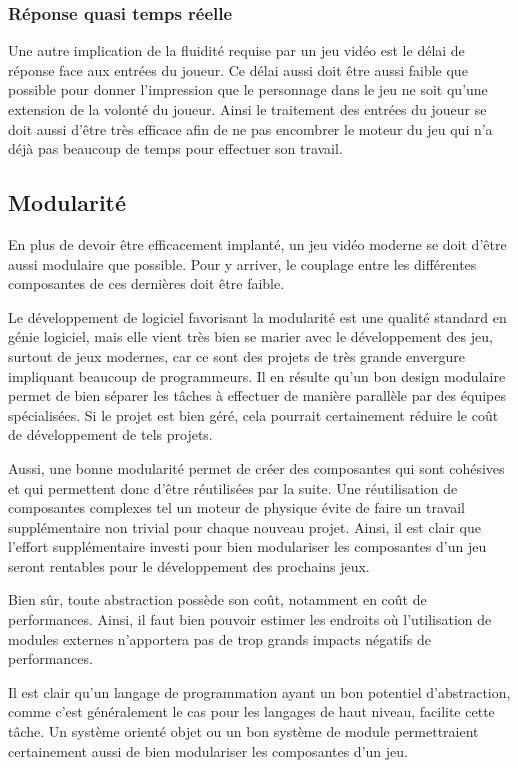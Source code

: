\documentclass[12pt,twoside,letterpaper,francais]{book}
\begin{document}
\FloatBarrier
\subsubsection{Réponse quasi temps réelle}
Une autre implication de la fluidité requise par un jeu vidéo est le
délai de réponse face aux entrées du joueur. Ce délai aussi doit être
aussi faible que possible pour donner l'impression que le personnage
dans le jeu ne soit qu'une extension de la volonté du joueur. Ainsi le
traitement des entrées du joueur se doit aussi d'être très efficace
afin de ne pas encombrer le moteur du jeu qui n'a déjà pas beaucoup de
temps pour effectuer son travail.

\FloatBarrier
\subsection{Modularité}
En plus de devoir être efficacement implanté, un jeu vidéo moderne se
doit d'être aussi modulaire que possible. Pour y arriver, le couplage
entre les différentes composantes de ces dernières doit être faible. 

Le développement de logiciel favorisant la modularité est une qualité
standard en génie logiciel, mais elle vient très bien se marier avec
le développement des jeu, surtout de jeux modernes, car ce sont des
projets de très grande envergure impliquant beaucoup de
programmeurs. Il en résulte qu'un bon design modulaire permet de bien
séparer les tâches à effectuer de manière parallèle par des équipes
spécialisées. Si le projet est bien géré, cela pourrait certainement
réduire le coût de développement de tels projets.

Aussi, une bonne modularité permet de créer des composantes qui sont
cohésives et qui permettent donc d'être réutilisées par la suite. Une
réutilisation de composantes complexes tel un moteur de physique évite
de faire un travail supplémentaire non trivial pour chaque nouveau
projet. Ainsi, il est clair que l'effort supplémentaire investi pour
bien modulariser les composantes d'un jeu seront rentables pour le
développement des prochains jeux.

Bien sûr, toute abstraction possède son coût, notamment en coût de
performances. Ainsi, il faut bien pouvoir estimer les endroits où
l'utilisation de modules externes n'apportera pas de trop grands
impacts négatifs de performances.

Il est clair qu'un langage de programmation ayant un bon potentiel
d'abstraction, comme c'est généralement le cas pour les langages de
haut niveau, facilite cette tâche. Un système orienté objet ou un bon
système de module permettraient certainement aussi de bien modulariser
les composantes d'un jeu.
\end{document}
